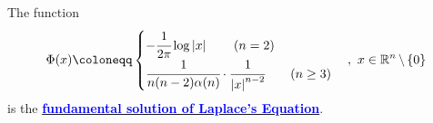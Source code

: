 	\vspace{2em}
	\begin{defn}\label{def 2.1.2}
		The function
		\begin{align}
			\Phi(x) \coloneqq 
			\begin{cases}
				-\cfrac{1}{2 \pi} \log \left| x \right| \hspace*{2em} (n = 2) \\
				\cfrac{1}{n (n - 2) \alpha(n)} \cdot \cfrac{1}{\left| x \right|^{n - 2}} \hspace*{2em} (n \geq 3)
			\end{cases} , \,\, x \in \R^n \, \backslash \, \{ 0 \}
		\end{align}
		is the \underline{\textcolor{blue}{\textbf{fundamental solution of Laplace's Equation}}}.
	\end{defn}



	\ifx\allfiles\undefined

\fi